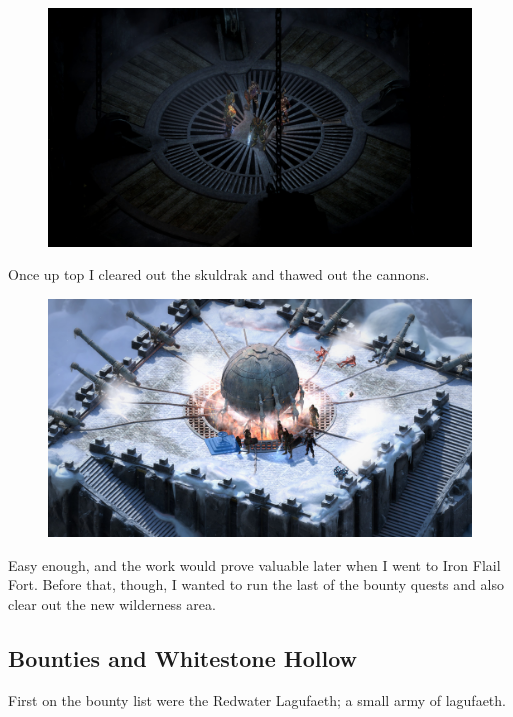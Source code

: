\documentclass{article}
\begin{document}
\begin{figure}
\includegraphics[scale=0.33]{files/blog/2020_01_18_poe_potd_wmpt2/2020_01_18_tower2.jpg}
\end{figure}

Once up top I cleared out the skuldrak and thawed out the cannons.

\begin{figure}
\includegraphics[scale=0.33]{files/blog/2020_01_18_poe_potd_wmpt2/2020_01_18_tower3.jpg}
\end{figure}

Easy enough, and the work would prove valuable later when I went to Iron Flail Fort.  Before that, though, I wanted to run the last of the bounty quests and also clear out the new wilderness area.

\subsection{Bounties and Whitestone Hollow}
First on the bounty list were the Redwater Lagufaeth; a small army of lagufaeth.
\end{document}
